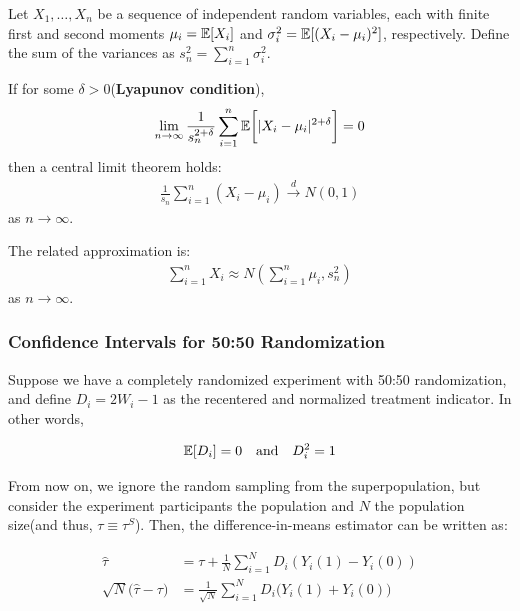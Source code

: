 \begin{theorem}
    Let $X_1, \ldots, X_n$ be a sequence of independent random variables, each with finite first and second moments $\mu_i = {\mathbb{E}}[X_i]$ and $\sigma_i^2 = {\mathbb{E}}[(X_i-\mu_i)^2]$, respectively.
    Define the sum of the variances as $s_n^2 = \sum_{i=1}^n \sigma_i^2$.

    If for some $\delta > 0$(\textbf{Lyapunov condition}),
    \begin{align}
        \lim_{n\to\infty} \frac{1}{s_n^{2+\delta}} \sum_{i=1}^n {\mathbb{E}}\biggl[\lvert X_i - \mu_i\rvert^{2+\delta}\biggr] = 0
    \end{align}
    then a central limit theorem holds:
    \begin{align}
        \frac{1}{s_n}\sum_{i=1}^n (X_i - \mu_i) \xrightarrow{d} N(0,1)
    \end{align}
    as $n\to\infty$.

    The related approximation is:
    \begin{align}
        \sum_{i=1}^n X_i \approx N(\sum_{i=1}^n \mu_i, s_n^2)
    \end{align}
    as $n\to\infty$.
\end{theorem}


\subsubsection{Confidence Intervals for 50:50 Randomization}

Suppose we have a completely randomized experiment with 50:50 randomization, and define $D_i = 2W_i - 1$ as the recentered and normalized treatment indicator.
In other words,

\begin{align}
    {\mathbb{E}}[D_i] = 0 \quad \text{and} \quad D_i^2 = 1
\end{align}

From now on, we ignore the random sampling from the superpopulation, but consider the experiment participants the population and $N$ the population size(and thus, $\tau\equiv\tau^S$).
Then, the difference-in-means estimator can be written as:

\begin{align}
    \hat\tau &= \tau + \frac{1}{N} \sum_{i=1}^N D_i(Y_i(1) - Y_i(0))\\
    \sqrt{N}\bigl(\hat\tau - \tau\bigr) &= \frac{1}{\sqrt{N}} \sum_{i=1}^N D_i\bigl(Y_i(1) + Y_i(0)\bigr)
\end{align}


